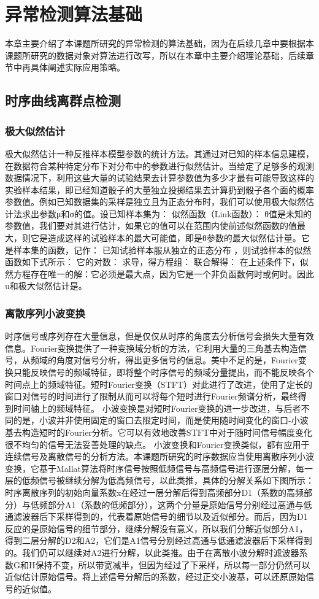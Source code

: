 \documentclass[a4paper,AutoFakeBold,oneside,12pt]{book}
\begin{document}
\chapter{异常检测算法基础}
本章主要介绍了本课题所研究的异常检测的算法基础，因为在后续几章中要根据本课题所研究的数据对象对算法进行改写，所以在本章中主要介绍理论基础，后续章节中再具体阐述实际应用策略。


\section{时序曲线离群点检测}
\subsection{极大似然估计}
极大似然估计一种反推样本模型参数的统计方法。其通过对已知的样本信息建模，在数据符合某种特定分布下对分布中的参数进行似然估计。当给定了足够多的观测数据情况下，利用这些大量的试验结果去计算参数值为多少才最有可能导致这样的实验样本结果，即已经知道骰子的大量独立投掷结果去计算扔到骰子各个面的概率参数值。例如已知数据集的采样是独立且为正态分布时，我们可以使用极大似然估计法求出参数μ和σ的值。设已知样本集为：
	似然函数（Link函数）：
	θ值是未知的参数值，我们要对其进行估计，如果它的值可以在范围内使前述似然函数的值最大，则它是造成这样的试验样本的最大可能值，即是θ参数的最大似然估计量。它是样本集的函数，记作：
	已知试验样本服从独立的正态分布 ，则试验样本的似然函数如下式所示：
	它的对数：
	求导，得方程组：
	联合解得：
	在上述条件下，似然方程存在唯一的解：它必须是最大点，因为它是一个非负函数何时或何时。因此u和极大似然估计是。
\subsection{离散序列小波变换}
时序信号或序列存在大量信息，但是仅仅从时序的角度去分析信号会损失大量有效信息。Fourier变换提供了一种变换域分析的方法，它利用大量的三角基去构造信号，从频域的角度对信号分析，得出更多信号的信息。美中不足的是，Fourier变换只能反映信号的频域特征，即将整个时序信号的频域分量提出，而不能反映各个时间点上的频域特征。短时Fourier变换（STFT）对此进行了改进，使用了定长的窗口对信号的时间进行了限制从而可以将每个短时进行Fourier频谱分析，最终得到时间轴上的频域特征。
	小波变换是对短时Fourier变换的进一步改进，与后者不同的是，小波并非使用固定的窗口去限定时间，而是使用随时间变化的窗口-小波基去构造短时的Fourier分析。它可以有效地改善STFT中对于随时间信号幅度变化很不均匀的信号无法妥善处理的缺点。
	小波变换和Fourier变换类似，都有应用于连续信号及离散信号的分析方法。本课题所研究的时序数据应当使用离散序列小波变换，它基于Mallat算法将时序信号按照低频信号与高频信号进行逐层分解，每一层的低频信号被继续分解为低高频信号，以此类推，具体的分解关系如下图所示：
	时序离散序列的初始向量系数x在经过一层分解后得到高频部分D1（系数的高频部分）与低频部分A1（系数的低频部分），这两个分量是原始信号分别经过高通与低通滤波器后下采样得到的，代表着原始信号的细节以及近似部分。而后，因为D1反应的是原始信号的细节部分，继续分解没有意义，所以我们分解近似部分A1，得到二层分解的D2和A2，它们是A1信号分别经过高通与低通滤波器后下采样得到的。我们仍可以继续对A2进行分解，以此类推。由于在离散小波分解时滤波器系数G和H保持不变，所以带宽减半，但因为经过了下采样，所以每一部分仍然可以近似估计原始信号。将上述信号分解后的系数，经过正交小波基，可以还原原始信号的近似值。
\end{document}
